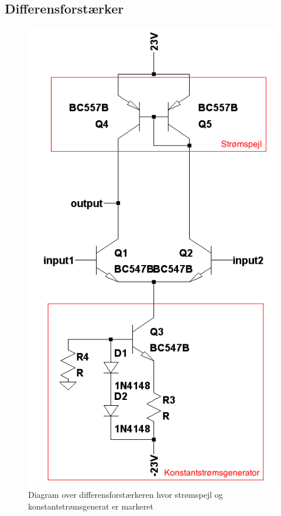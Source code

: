 \subsection{Differensforstærker}
\label{effekt_differensforstaerker}

\begin{figure}[h]
\centering
\includegraphics[scale=.4]{teknisk/effektforstaerker/differensforstaerker.png}
\caption{Diagram over differensforstærkeren hvor strømspejl og konstantstrømsgenerat er markeret}
\label{fig:differensforstaerker}
\end{figure}

